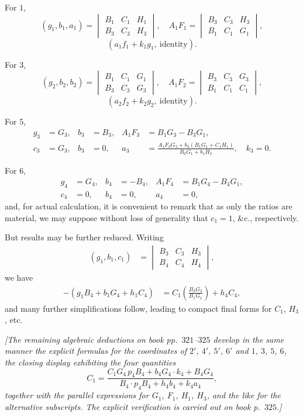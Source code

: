 \documentclass[11pt,a4paper]{article}
\begin{document}
For $1$,
\[
(g_1, b_1, a_1) =
\begin{vmatrix} B_1 & C_1 & H_1 \\ B_3 & C_3 & H_3 \end{vmatrix},\quad
A_1 F_1 = \begin{vmatrix} B_3 & C_3 & H_3 \\ B_1 & C_1 & G_1 \end{vmatrix},
\]
\[
(a_1 f_1 + k_1 g_1,\ \text{identity}).
\]

For $3$,
\[
(g_2, b_2, b_2) =
\begin{vmatrix} B_1 & C_1 & G_1 \\ B_3 & C_3 & G_3 \end{vmatrix},\quad
A_1 F_2 = \begin{vmatrix} B_3 & C_3 & G_3 \\ B_1 & C_1 & C_1 \end{vmatrix},
\]
\[
(a_2 f_2 + k_2 g_2,\ \text{identity}).
\]

For $5$,
\[
\begin{aligned}
g_3 &= G_3,& b_3 &= B_3,& A_1 F_3 &= B_1 G_3 - B_3 G_1,\\
c_3 &= G_3, & b_3 &= 0,& a_3 &= \frac{A_1 F_3 G_3 + b_3 (B_1 G_1 + C_1 H_1)}
{B_3 G_1 + b_1 H_3},\quad k_3 = 0.
\end{aligned}
\]

For $6$,
\[
\begin{aligned}
g_4 &= G_4,& b_4 &= -B_4,& A_1 F_4 &= B_1 G_4 - B_4 G_1,\\
c_4 &= 0,& b_4 &= 0,& a_4 &= 0,
\end{aligned}
\]
and, for actual calculation, it is convenient to remark that as only the
ratios are material, we may suppose without loss of generality that
$c_1 = 1$, \&c., respectively.

But results may be further reduced. Writing
\[
\begin{aligned}
(g_1, b_1, c_1) &= \begin{vmatrix} B_3 & C_3 & H_3 \\ B_4 & C_4 & H_4 \end{vmatrix},
\end{aligned}
\]
we have
\[
\begin{aligned}
-(g_1 B_4 + b_1 G_4 + h_1 C_4) &= C_1\!\left(\frac{B_3 G_3}{B_1 G_1}\right) + h_4 C_4\!,
\end{aligned}
\]
and many further simplifications follow, leading to compact final forms for
$C_1$, $H_3$, etc.

\medskip
\noindent\textit{[The remaining algebraic deductions on book pp.~$321$--$325$
develop in the same manner the explicit formulas for the coordinates of
$2'$, $4'$, $5'$, $6'$ and $1$, $3$, $5$, $6$, the closing display
exhibiting the four quantities
\[
C_1 = \frac{C_1 G_4\,p_4 B_4 + b_4 G_4 \cdot k_4 + B_4 G_4}{B_4
\cdot p_4 B_4 + h_4 b_4 + k_4 a_4},
\]
together with the parallel expressions for $G_1$, $F_1$, $H_1$, $H_3$, and
the like for the alternative subscripts. The explicit verification is
carried out on book p.~$325$.]}
\end{document}
